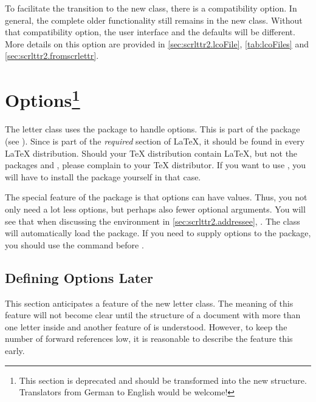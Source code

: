To facilitate the transition to the new class, there is a
compatibility option. In general, the complete older functionality
still remains in the new class.  Without that compatibility option,
the user interface and the defaults will be different. More details on
this option are provided in \autoref{sec:scrlttr2.lcoFile},
\autoref{tab:lcoFiles} and \autoref{sec:scrlttr2.fromscrlettr}.


\section{Options\protect\footnote{This section is
  deprecated and should be transformed into the new structure. Translators
  from German to English would be welcome!}}
\label{sec:scrlttr2.options}

The letter class  uses the package
 to handle options. This is part
of the  package (see \cite{package:graphics}). Since
 is part of the \emph{required} section of {\LaTeX},
it should be found in every {\LaTeX} distribution. Should your {\TeX}
distribution contain {\LaTeX}, but not the packages 
and , please complain to your {\TeX} distributor. If
you want to use , you will have to install the
 package yourself in that case.

\begin{Explain}
  The special feature of the  package is that options
  can have values. Thus, you not only need a lot less options, but
  perhaps also fewer optional arguments. You will see that when
  discussing the  environment in
  \autoref{sec:scrlttr2.addressee},
  . The class will
  automatically load the  package. If you need to
  supply options to the  package, you should use the
   command before .
\end{Explain}

\subsection{Defining Options Later}
\label{sec:scrlttr2.options.late}

This section anticipates a feature of the new letter class. The
meaning of this feature will not become clear until the structure of a
document with more than one letter inside and another feature of
 is understood. However, to keep the number of forward
references low, it is reasonable to describe the feature this early.

